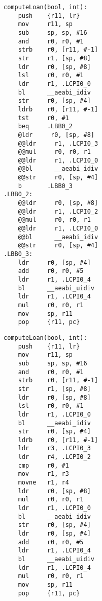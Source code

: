 \begin{minipage}{0.45\textwidth}
    \begin{lstlisting}[style=AsmStyle, basicstyle=\fontsize{4}{5}\selectfont\ttfamily]
computeLoan(bool, int):
    push    {r11, lr}
    mov     r11, sp
    sub     sp, sp, #16
    and     r0, r0, #1
    strb    r0, [r11, #-1]
    str     r1, [sp, #8]
    ldr     r0, [sp, #8]
    lsl     r0, r0, #1
    ldr     r1, .LCPI0_0
    bl      __aeabi_idiv
    str     r0, [sp, #4]
    ldrb    r0, [r11, #-1]
    tst     r0, #1
    beq     .LBB0_2
    @ldr     r0, [sp, #8]
    @@ldr     r1, .LCPI0_3
    @@mul     r0, r0, r1
    @@ldr     r1, .LCPI0_0
    @@bl      __aeabi_idiv
    @@str     r0, [sp, #4]
    b       .LBB0_3
.LBB0_2:
    @@ldr     r0, [sp, #8]
    @@ldr     r1, .LCPI0_2
    @@mul     r0, r0, r1
    @@ldr     r1, .LCPI0_0
    @@bl      __aeabi_idiv
    @@str     r0, [sp, #4]
.LBB0_3:
    ldr     r0, [sp, #4]
    add     r0, r0, #5
    ldr     r1, .LCPI0_4
    bl      __aeabi_uidiv
    ldr     r1, .LCPI0_4
    mul     r0, r0, r1
    mov     sp, r11
    pop     {r11, pc}
    \end{lstlisting}
\end{minipage}%
\hspace{1cm}
\begin{minipage}{0.45\textwidth}
    \begin{lstlisting}[style=AsmStyle, numbers=right,  basicstyle=\fontsize{4}{5}\selectfont\ttfamily, belowskip=8.5\baselineskip]
computeLoan(bool, int):
    push    {r11, lr}
    mov     r11, sp
    sub     sp, sp, #16
    and     r0, r0, #1
    strb    r0, [r11, #-1]
    str     r1, [sp, #8]
    ldr     r0, [sp, #8]
    lsl     r0, r0, #1
    ldr     r1, .LCPI0_0
    bl      __aeabi_idiv
    str     r0, [sp, #4]
    ldrb    r0, [r11, #-1]
    ldr     r3, .LCPI0_3
    ldr     r4, .LCPI0_2
    cmp     r0, #1
    mov     r1, r3
    movne   r1, r4
    ldr     r0, [sp, #8]
    mul     r0, r0, r1
    ldr     r1, .LCPI0_0
    bl      __aeabi_idiv
    str     r0, [sp, #4]
    ldr     r0, [sp, #4]
    add     r0, r0, #5
    ldr     r1, .LCPI0_4
    bl      __aeabi_uidiv
    ldr     r1, .LCPI0_4
    mul     r0, r0, r1
    mov     sp, r11
    pop     {r11, pc} 
    \end{lstlisting}
\end{minipage}%
